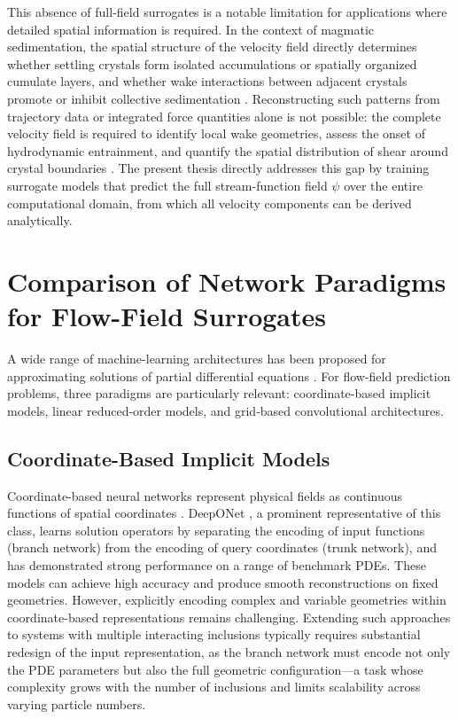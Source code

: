 This absence of full-field surrogates is a notable limitation for applications where detailed spatial information is required. In the context of magmatic sedimentation, the spatial structure of the velocity field directly determines whether settling crystals form isolated accumulations or spatially organized cumulate layers, and whether wake interactions between adjacent crystals promote or inhibit collective sedimentation \parencite{weinstein_evolution_1988,verhoeven_numerical_2009}. Reconstructing such patterns from trajectory data or integrated force quantities alone is not possible: the complete velocity field is required to identify local wake geometries, assess the onset of hydrodynamic entrainment, and quantify the spatial distribution of shear around crystal boundaries \parencite{martin_crystal_1988}. The present thesis directly addresses this gap by training surrogate models that predict the full stream-function field $\psi$ over the entire computational domain, from which all velocity components can be derived analytically.

\section{Comparison of Network Paradigms for Flow-Field Surrogates}

A wide range of machine-learning architectures has been proposed for approximating solutions of partial differential equations \parencite{kovachki_operator_nodate,takamoto_pdebench_nodate}. For flow-field prediction problems, three paradigms are particularly relevant: coordinate-based implicit models, linear reduced-order models, and grid-based convolutional architectures.

\subsection{Coordinate-Based Implicit Models}

Coordinate-based neural networks represent physical fields as continuous functions of spatial coordinates \parencite{kovachki_neural_nodate}. DeepONet \parencite{lu_comprehensive_2022}, a prominent representative of this class, learns solution operators by separating the encoding of input functions (branch network) from the encoding of query coordinates (trunk network), and has demonstrated strong performance on a range of benchmark PDEs. These models can achieve high accuracy and produce smooth reconstructions on fixed geometries. However, explicitly encoding complex and variable geometries within coordinate-based representations remains challenging. Extending such approaches to systems with multiple interacting inclusions typically requires substantial redesign of the input representation, as the branch network must encode not only the PDE parameters but also the full geometric configuration—a task whose complexity grows with the number of inclusions and limits scalability across varying particle numbers.

